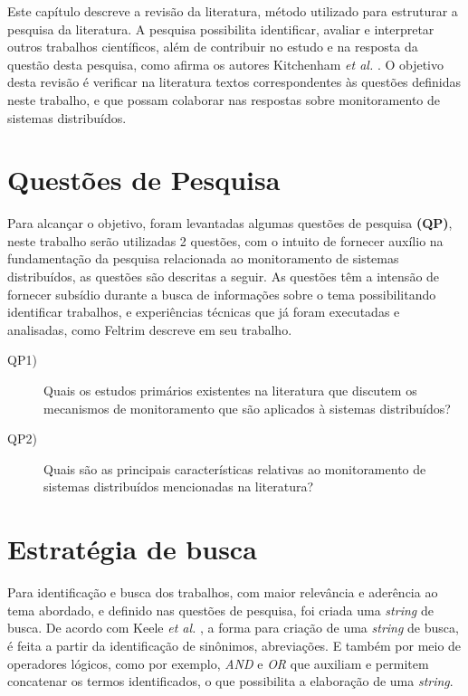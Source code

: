 \label{mapeamento_sistematico}

Este capítulo descreve a revisão da literatura, método utilizado para estruturar a pesquisa da literatura. A pesquisa possibilita identificar, avaliar e interpretar outros trabalhos científicos, além de contribuir no estudo e na resposta da questão desta pesquisa, como afirma os autores Kitchenham \textit{et al.} \cite{kitchenham2007guidelines,petticrew2008systematic,de2018mapeamento}. O objetivo desta revisão é verificar na literatura textos correspondentes às questões definidas neste trabalho, e que possam colaborar nas respostas sobre monitoramento de sistemas distribuídos.


\section{Questões de Pesquisa}
\label{questoes1e2}

Para alcançar o objetivo, foram levantadas algumas questões de pesquisa \textbf{(QP)}, neste trabalho serão utilizadas 2 questões, com o intuito de fornecer auxílio na fundamentação da pesquisa relacionada ao monitoramento de sistemas distribuídos, as questões são descritas a seguir. As questões têm a intensão de fornecer subsídio durante a busca de informações sobre o tema possibilitando identificar trabalhos, e experiências técnicas que já foram executadas e analisadas, como Feltrim\cite{feltrim2004abordagem} descreve em seu trabalho.

\begin{description}
\item[QP1)] Quais os estudos primários existentes na literatura que discutem os mecanismos de monitoramento 
que são aplicados à sistemas distribuídos?
\item[QP2)] Quais são as principais características relativas ao monitoramento de sistemas
distribuídos mencionadas na literatura?
\end{description}


\section{Estratégia de busca}
\label{sec:stringbusca}

Para identificação e busca dos trabalhos, com maior relevância e aderência ao tema abordado, e definido nas questões de pesquisa, foi criada uma \textit{string} de busca. De acordo com Keele \textit{et al.} \cite{keele2007guidelines}, a forma para criação de uma \textit{string} de busca, é feita a partir da identificação de sinônimos, abreviações. E também por meio de operadores lógicos, como por exemplo, \textit{AND} e \textit{OR} que auxiliam e permitem concatenar os termos identificados, o que possibilita a elaboração de uma \textit{string}. 

